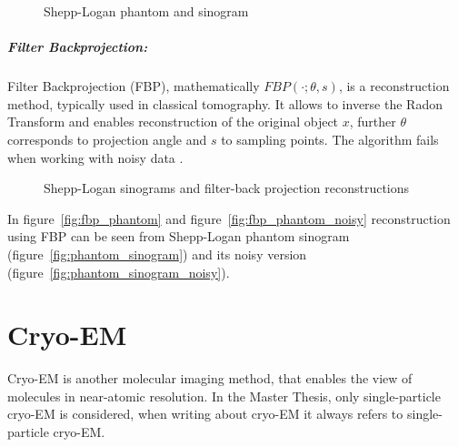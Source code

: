 \begin{figure}[H]
    \label{fig:phantom_and_sinos}
    \hfill
    \hfill
    \hfill
    \hfill
	\caption{Shepp-Logan phantom and sinogram}
\end{figure}

\subparagraph{Filter Backprojection:}
Filter Backprojection \cite{tomographicReconstruction} (FBP), mathematically $FBP(\cdot; \theta, s)$, is a reconstruction method, typically used in classical tomography.
It allows to inverse the Radon Transform and enables reconstruction of the original object $x$, further $\theta$ corresponds to 
projection angle and $s$ to sampling points. 
The algorithm fails when working with noisy data \cite{cryoEmMath2}.

\begin{figure}[H]
    \label{fig:phantom_fbps}
    \hfill
    \hfill
    \hfill
	\caption{Shepp-Logan sinograms and filter-back projection reconstructions}
\end{figure}

In figure~\ref{fig:fbp_phantom} and figure~\ref{fig:fbp_phantom_noisy} reconstruction using FBP can be seen from 
Shepp-Logan phantom sinogram (figure~\ref{fig:phantom_sinogram}) and its noisy version (figure~\ref{fig:phantom_sinogram_noisy}).

\section{Cryo-EM}
Cryo-EM is another molecular imaging method, that enables the view of molecules in near-atomic resolution.
In the Master Thesis, only single-particle cryo-EM \cite{singleParticleCryoEm} is considered, 
when writing about cryo-EM it always refers to single-particle cryo-EM.

